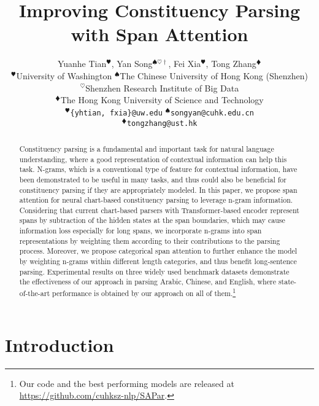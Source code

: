 \documentclass[11pt,a4paper]{article}
\title{Improving Constituency Parsing with Span Attention}
\author{
    Yuanhe Tian$^{\varheart}$, \hspace{0.2cm}
    Yan Song$^{{\spadesuit}\heartsuit\dag}$, \hspace{0.2cm}
    Fei Xia$^{\varheart}$, \hspace{0.2cm}
    Tong Zhang$^{\vardiamond}$ \\
$^{\varheart}$University of Washington \hspace{0.4cm}
$^{\spadesuit}$The Chinese University of Hong Kong (Shenzhen)\\
    $^{\heartsuit}$Shenzhen Research Institute of Big Data \\
    $^{\vardiamond}$The Hong Kong University of Science and Technology\\
$^{\varheart}$\texttt{\{yhtian, fxia\}@uw.edu} \hspace{0.4cm} 
    $^{\spadesuit}$\texttt{songyan@cuhk.edu.cn} \\
    $^{\vardiamond}$\texttt{tongzhang@ust.hk} \hspace{0.4cm}
}
\date{}
\begin{document}
\maketitle


\renewcommand{\thefootnote}{\fnsymbol{footnote}}

\renewcommand{\thefootnote}{\arabic{footnote}}


\begin{abstract}


Constituency parsing is a fundamental and important task for natural language understanding, 
where a good representation of contextual information can help this task.
N-grams, which is a conventional type of feature for contextual information, have been demonstrated to be useful in many tasks, and thus could also be beneficial for constituency parsing if they are appropriately modeled.
In this paper, we propose span attention for neural chart-based constituency parsing to leverage n-gram information.
Considering that current chart-based parsers with Transformer-based encoder represent spans by subtraction of the hidden states at the span boundaries, which may cause information loss especially for long spans, we incorporate n-grams into span representations by weighting them according to their contributions to the parsing process.
Moreover, we propose categorical span attention to further enhance the model
by weighting n-grams within different length categories,
and thus benefit long-sentence parsing.
Experimental results on three widely used benchmark datasets demonstrate the effectiveness of our approach in parsing 
Arabic, Chinese, and English, where state-of-the-art performance is obtained by our approach on all of them.\footnote{Our code and the best performing models are released at \url{https://github.com/cuhksz-nlp/SAPar}.}


\end{abstract}


\section{Introduction}
\label{intro}
\end{document}
